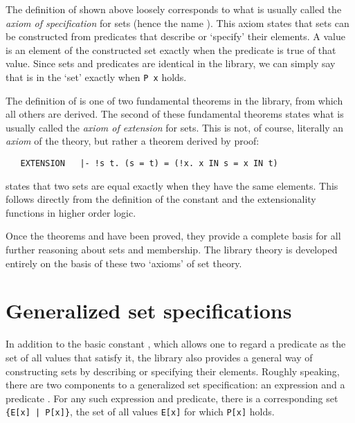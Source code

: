 The definition of  shown above loosely corresponds to what is usually
called the {\it axiom of specification\/} for
sets (hence the name ). This axiom states that sets can be
constructed from predicates that describe or `specify' their elements. A value
is an element of the constructed set exactly when the predicate is true of that
value.  Since sets and predicates are identical in the  library,
we can simply say that  is in the `set'  exactly when
{\small\verb!P x!} holds.

The definition of  is one of two fundamental theorems in the
 library, from which all others are derived.  The second of
these fundamental theorems states what is usually called the {\it axiom of
extension\/} for sets.  This is not, of course,
literally an {\it axiom\/} of the  theory, but rather a theorem
derived by proof:

\begin{hol}
\begin{verbatim}
   EXTENSION   |- !s t. (s = t) = (!x. x IN s = x IN t)
\end{verbatim}\end{hol}

\noindent {} states that two sets are equal exactly when they have
the same elements.  This follows directly from the definition of the constant
 and the extensionality functions in higher order logic.

Once the theorems  and  have been proved, they
provide a complete basis for all further reasoning about sets and membership.
The library theory  is developed entirely on the basis of these
two `axioms' of set theory.

\section{Generalized set specifications}

In addition to the basic constant , which allows one to regard a
predicate as the set of all values that satisfy it, the  library
also provides a general way of constructing sets by describing or specifying
their elements.  Roughly speaking, there are two components to a generalized
set specification: an expression  and a predicate . For any
such expression and predicate, there is a corresponding set
{\small\verb!{E[x] | P[x]}!}, the set of all values {\small\verb!E[x]!} for
which {\small\verb!P[x]!} holds.

